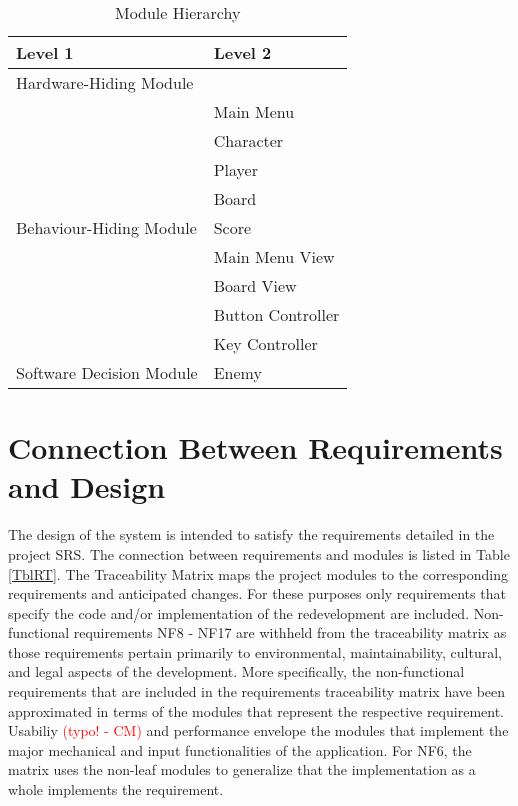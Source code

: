 \documentclass[12pt, titlepage]{article}
\begin{document}
\begin{table}[h!]
\centering
\begin{tabular}{p{} p{}}
\toprule
\textbf{Level 1} & \textbf{Level 2}\\
\midrule

{Hardware-Hiding Module} & ~ \\
\midrule

\multirow{9}{0.3\textwidth}{Behaviour-Hiding Module}
& Main Menu\\
& Character\\
& Player\\
& Board\\
& Score\\
& Main Menu View\\ 
& Board View\\
& Button Controller\\
& Key Controller\\
\midrule

{Software Decision Module} & Enemy\\
\bottomrule

\end{tabular}
\caption{Module Hierarchy}
\label{TblMH}
\end{table}

\section{Connection Between Requirements and Design} \label{SecConnection}

The design of the system is intended to satisfy the requirements detailed in the project SRS. The connection
between requirements and modules is listed in Table \ref{TblRT}. The Traceability Matrix maps the project modules to the corresponding requirements and anticipated changes. For these purposes only requirements that specify the code and/or implementation of the redevelopment are included. Non-functional requirements NF8 - NF17 are withheld from the traceability matrix as those requirements pertain primarily to environmental, maintainability, cultural, and legal aspects of the development. More specifically, the non-functional requirements that are included in the requirements traceability matrix have been approximated in terms of the modules that represent the respective requirement. Usabiliy \textcolor{red}{(typo! - CM)} and performance envelope the modules that implement the major mechanical and input functionalities of the application. For NF6, the matrix uses the non-leaf modules to generalize that the implementation as a whole implements the requirement.
\end{document}
